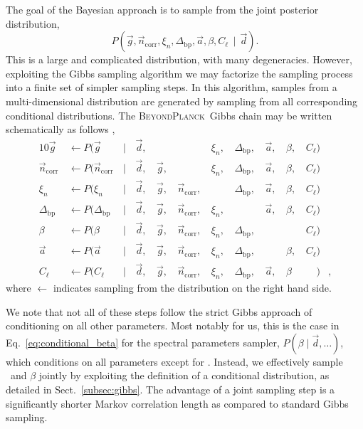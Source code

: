 \documentclass[twocolumn]{aa}
\renewcommand{\d}[0]{\vec{d}}
\newcommand{\n}[0]{\vec{n}}
\renewcommand{\a}[0]{\vec{a}}
\newcommand{\g}[0]{\vec{g}}
\newcommand{\Dbp}[0]{\Delta_{\mathrm{bp}}}
\newcommand{\BP}{\textsc{BeyondPlanck}}
\begin{document}
The goal of the Bayesian approach is to sample from the joint posterior distribution,
\begin{equation}
  P(\g,\n_{\mathrm{corr}},\xi_n,\Dbp,\a,\beta,C_{\ell}\,\mid\,\d).
  \label{eq:joint_posterior_full}
\end{equation}
This is a large and complicated distribution, with many degeneracies.
However, exploiting the Gibbs sampling algorithm \citep{geman:1984} we
may factorize the sampling process into a finite set of simpler
sampling steps. In this algorithm, samples from a multi-dimensional
distribution are generated by sampling from all corresponding
conditional distributions. The \BP\ Gibbs chain may
be written schematically as follows \citep{bp01},
\begin{alignat}{10}
\g &\,\leftarrow P(\g&\,\mid &\,\d,&\, & &\,\xi_n, &\,\Dbp, &\,\a, &\,\beta, &\,C_{\ell})\label{eq:conditional_gain}\\
\n_{\mathrm{corr}} &\,\leftarrow P(\n_{\mathrm{corr}}&\,\mid &\,\d, &\,\g, &\,&\,\xi_n,
&\,\Dbp, &\,\a, &\,\beta, &\,C_{\ell})\\
\xi_n &\,\leftarrow P(\xi_n&\,\mid &\,\d, &\,\g, &\,\n_{\mathrm{corr}}, &\,
&\,\Dbp, &\,\a, &\,\beta, &\,C_{\ell})\\
\Dbp &\,\leftarrow P(\Dbp&\,\mid &\,\d, &\,\g, &\,\n_{\mathrm{corr}}, &\,\xi_n,
&\,&\,\a, &\,\beta, &\,C_{\ell})\\
\beta &\,\leftarrow P(\beta&\,\mid &\,\d, &\,\g, &\,\n_{\mathrm{corr}}, &\,\xi_n,
&\,\Dbp, & &\,&\,C_{\ell})\label{eq:conditional_beta}\\
\a &\,\leftarrow P(\a&\,\mid &\,\d, &\,\g, &\,\n_{\mathrm{corr}}, &\,\xi_n,
&\,\Dbp, &\,&\,\beta, &\,C_{\ell})\label{eq:conditional_amp}\\
C_{\ell} &\,\leftarrow P(C_{\ell}&\,\mid &\,\d, &\,\g, &\,\n_{\mathrm{corr}}, &\,\xi_n,
	&\,\Dbp, &\,\a, &\,\beta&\,\phantom{C_{\ell}})&,\label{eq:conditional_bp}
\end{alignat}
where $\leftarrow$ indicates sampling from the distribution on the right hand side.


We note that not all of these steps follow the strict Gibbs approach
of conditioning on all other parameters. Most notably for us, this is
the case in Eq.~\eqref{eq:conditional_beta} for the spectral
parameters sampler, $P(\beta\mid\d,\ldots)$, which conditions on all parameters
except for \a. Instead, we effectively sample \a\ and $\beta$ jointly by
exploiting the definition of a conditional distribution, as detailed
in Sect.~\ref{subsec:gibbs}. The advantage of a joint sampling step is
a significantly shorter Markov correlation length as compared to
standard Gibbs sampling.
\end{document}
